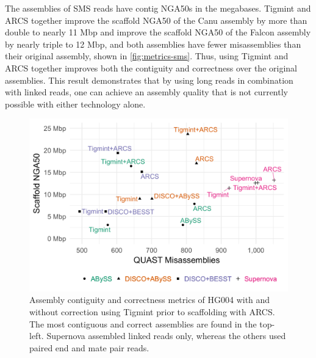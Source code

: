 \documentclass[
  12pt,
  oneside,
  openany]{book}
\begin{document}
The assemblies of SMS reads have contig NGA50s in the megabases. Tigmint and ARCS together improve the scaffold NGA50 of the Canu assembly by more than double to nearly 11 Mbp and improve the scaffold NGA50 of the Falcon assembly by nearly triple to 12 Mbp, and both assemblies have fewer misassemblies than their original assembly, shown in \cref{fig:metrics-sms}. Thus, using Tigmint and ARCS together improves both the contiguity and correctness over the original assemblies. This result demonstrates that by using long reads in combination with linked reads, one can achieve an assembly quality that is not currently possible with either technology alone.

\begin{figure}
\hypertarget{fig:tigmint-metrics}{%
\centering
\includegraphics{tigmint/metrics.png}
\caption[Assembly contiguity and correctness metrics of HG004 with and without correction using Tigmint prior to scaffolding with ARCS.]{Assembly contiguity and correctness metrics of HG004 with and without correction using Tigmint prior to scaffolding with ARCS. The most contiguous and correct assemblies are found in the top-left. Supernova assembled linked reads only, whereas the others used paired end and mate pair reads.}\label{fig:tigmint-metrics}
}
\end{figure}
\end{document}
